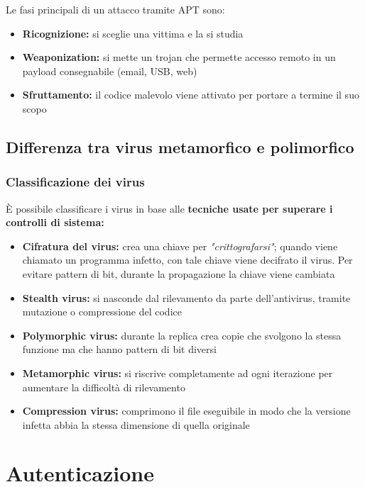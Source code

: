 \documentclass{report}
\begin{document}
\noindent Le fasi principali di un attacco tramite APT sono:
\begin{itemize}
    \item \textbf{Ricognizione:} si sceglie una vittima e la si studia 
    \item \textbf{Weaponization:} si mette un trojan che permette accesso remoto in un payload consegnabile (email, USB, web)
    \item \textbf{Sfruttamento:} il codice malevolo viene attivato per portare a termine il suo scopo
\end{itemize}



\section{Differenza tra virus metamorfico e polimorfico}
\subsection{Classificazione dei virus}
È possibile classificare i virus in base alle \textbf{tecniche usate per superare i controlli 
di sistema:}
\begin{itemize}
    \item \textbf{Cifratura del virus:} crea una chiave per \textit{"crittografarsi"}; quando viene 
    chiamato un programma infetto, con tale chiave viene decifrato il virus. Per evitare pattern 
    di bit, durante la propagazione la chiave viene cambiata
    \item \textbf{Stealth virus:} si nasconde dal rilevamento da parte dell'antivirus, tramite mutazione 
    o compressione del codice 
    \item \textbf{Polymorphic virus:} durante la replica crea copie che svolgono la stessa funzione 
    ma che hanno pattern di bit diversi 
    \item \textbf{Metamorphic virus:} si riscrive completamente ad ogni iterazione per aumentare la 
    difficoltà di rilevamento
    \item \textbf{Compression virus:} comprimono il file eseguibile in modo che la versione infetta 
    abbia la stessa dimensione di quella originale
\end{itemize} 



\chapter{Autenticazione}
\end{document}
